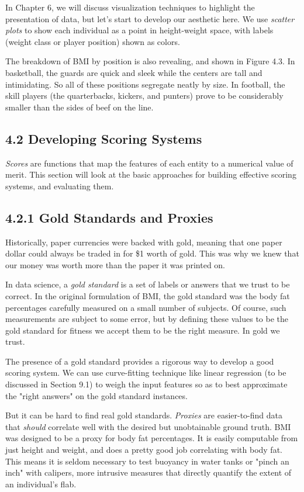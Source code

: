 \documentclass[10pt]{article}
\begin{document}
In Chapter 6, we will discuss visualization techniques to highlight the presentation of data, but let's start to develop our aesthetic here. We use \textit{scatter plots} to show each individual as a point in height-weight space, with labels (weight class or player position) shown as colors.

The breakdown of BMI by position is also revealing, and shown in Figure 4.3. In basketball, the guards are quick and sleek while the centers are tall and intimidating. So all of these positions segregate neatly by size. In football, the skill players (the quarterbacks, kickers, and punters) prove to be considerably smaller than the sides of beef on the line.

\subsection*{4.2 Developing Scoring Systems}
\textit{Scores} are functions that map the features of each entity to a numerical value of merit. This section will look at the basic approaches for building effective scoring systems, and evaluating them.

\subsection*{4.2.1 Gold Standards and Proxies}
Historically, paper currencies were backed with gold, meaning that one paper dollar could always be traded in for \$1 worth of gold. This was why we knew that our money was worth more than the paper it was printed on.

In data science, a \textit{gold standard} is a set of labels or answers that we trust to be correct. In the original formulation of BMI, the gold standard was the body fat percentages carefully measured on a small number of subjects. Of course, such measurements are subject to some error, but by defining these values to be the gold standard for fitness we accept them to be the right measure. In gold we trust.

The presence of a gold standard provides a rigorous way to develop a good scoring system. We can use curve-fitting technique like linear regression (to be discussed in Section 9.1) to weigh the input features so as to best approximate the "right answers" on the gold standard instances.

But it can be hard to find real gold standards. \textit{Proxies} are easier-to-find data that \textit{should} correlate well with the desired but unobtainable ground truth. BMI was designed to be a proxy for body fat percentages. It is easily computable from just height and weight, and does a pretty good job correlating with body fat. This means it is seldom necessary to test buoyancy in water tanks or "pinch an inch" with calipers, more intrusive measures that directly quantify the extent of an individual's flab.
\end{document}
